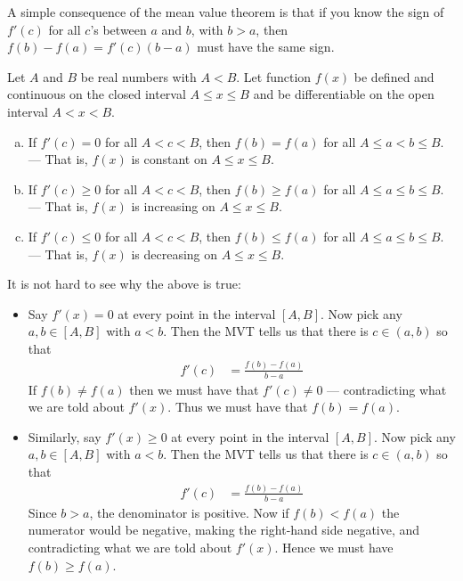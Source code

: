 A simple consequence of the mean value theorem is that if you know the
sign of $f'(c)$ for all $c$'s between $a$ and $b$, with $b>a$, then
$f(b)-f(a) = f'(c) (b-a)$ must have the same sign.
\begin{cor}
\label{cor:DIFFmvtcons}
Let $A$ and $B$ be real numbers with $A<B$.
Let function $f(x)$ be defined and continuous on
the closed interval $A\le x\le B$ and be differentiable on the
open interval $A<x<B$.
\begin{enumerate}[(a)]
\item If $f'(c)=0$ for all $A<c<B$, then $f(b)=f(a)$ for all
$A\le a<b\le B$.\\
--- That is, $f(x)$ is constant on $A\le x\le B$.
\item If $f'(c)\ge 0$ for all $A<c<B$, then $f(b)\ge f(a)$ for all
$A\le a\le b\le B$.\\
--- That is, $f(x)$ is increasing on $A\le x\le B$.
\item If $f'(c)\le 0$ for all $A<c<B$, then $f(b)\le f(a)$ for all
$A\le a \le b\le B$.\\
--- That is, $f(x)$ is decreasing on $A\le x\le B$.
\end{enumerate}

\end{cor}
It is not hard to see why the above is true:
\begin{itemize}
 \item Say $f'(x)=0$ at every point in the interval $[A,B]$. Now pick any $a,b \in [A,B]$
with $a<b$. Then the MVT tells us that there is $c \in (a,b)$ so that
\begin{align*}
  f'(c) &= \frac{f(b)-f(a)}{b-a}
\end{align*}
If $f(b) \neq f(a)$ then we must have that $f'(c) \neq 0$ --- contradicting what we are
told about $f'(x)$. Thus we must have that $f(b)=f(a)$.

\item Similarly, say $f'(x) \geq 0$ at every point in the interval $[A,B]$. Now pick any
$a,b \in [A,B]$  with $a<b$. Then the MVT tells us that there is $c \in (a,b)$ so that
\begin{align*}
  f'(c) &= \frac{f(b)-f(a)}{b-a}
\end{align*}
Since $b>a$, the denominator is positive. Now if $f(b) < f(a)$ the numerator would be
negative, making the right-hand side negative, and contradicting what we are told about
$f'(x)$. Hence we must have $f(b)\ge f(a)$.
\end{itemize}

